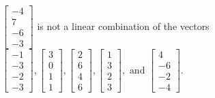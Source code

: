 \begin{exercise}
\begin{exerciseStatement}
  \end{exerciseStatement}
  \begin{exerciseAnswer}
   \(\left[\begin{array}{c}
-4 \\
7 \\
-6 \\
-3
\end{array}\right]\) 
  	 is not  
	a linear combination of the vectors \(\left[\begin{array}{c}
-1 \\
-3 \\
-2 \\
-3
\end{array}\right] , \left[\begin{array}{c}
3 \\
0 \\
1 \\
1
\end{array}\right] , \left[\begin{array}{c}
2 \\
6 \\
4 \\
6
\end{array}\right] , \left[\begin{array}{c}
1 \\
3 \\
2 \\
3
\end{array}\right] , \text{ and } \left[\begin{array}{c}
4 \\
-6 \\
-2 \\
-4
\end{array}\right]\).

	
  


  \end{exerciseAnswer}
\end{exercise}